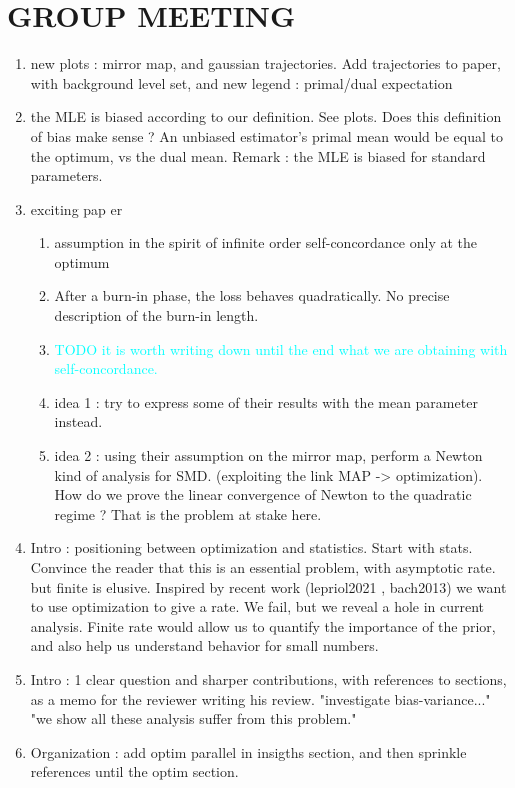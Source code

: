 \documentclass[twoside]{article}
\let\oldsection\section
\renewcommand{\section}[1]{\oldsection{\texorpdfstring{\uppercase{#1}}{#1}}}
\newcommand{\TODO}[1]{\textcolor{cyan}{TODO #1}}
\begin{document}
\section{Group Meeting}
\begin{enumerate}
	\item new plots : mirror map, and gaussian trajectories. Add trajectories to paper, with background level set, and new legend : primal/dual expectation
	\item the MLE is biased according to our definition. See plots. Does this definition of bias make sense ? An unbiased estimator's primal mean would be equal to the optimum, vs the dual mean.  Remark : the MLE is biased for standard parameters.
	\item exciting pap er\citet{kakade2010learning}
	\begin{enumerate}
		\item assumption in the spirit of infinite order self-concordance only at the optimum
		\item After a burn-in phase, the loss behaves quadratically. No precise description of the burn-in length.
		\item \TODO{it is worth writing down until the end what we are obtaining with self-concordance.}
		\item idea 1 : try to express some of their results with the mean parameter instead.
		\item idea 2 : using their assumption on the mirror map, perform a Newton kind of analysis for SMD. (exploiting the link MAP -> optimization). How do we prove the linear convergence of Newton to the quadratic regime ? That is the problem at stake here.
	\end{enumerate}
	\item Intro : positioning between optimization and statistics. Start with stats. Convince the reader that this is an essential problem, with asymptotic rate. but finite is elusive. Inspired by recent work (lepriol2021 , bach2013) we want to use optimization to give a rate. We fail, but we reveal a hole in current analysis.  Finite rate would allow us to quantify the importance of the prior, and also help us understand behavior for small numbers. 
	\item Intro : 1 clear question and sharper contributions, with references to sections, as a memo for the reviewer writing his review. "investigate bias-variance..." "we show all these analysis suffer from this problem."
	\item Organization : add optim parallel in insigths section, and then sprinkle references until the optim section.

\end{enumerate}
\end{document}
